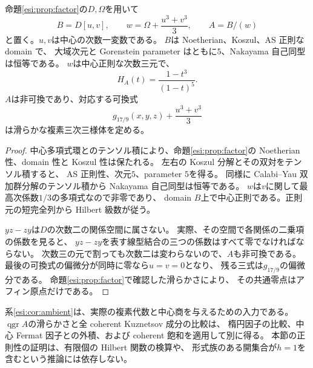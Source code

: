 \begin{corollary}[二つの中心変数を加えた実三次対]
\label{esi:cor:ambient}
命題\ref{esi:prop:factor}の$D,\Omega$を用いて
\begin{equation}\label{esi:eq:ambient}
 B=D[u,v],\qquad w=\Omega+\frac{u^3+v^3}{3},\qquad A=B/(w)
\end{equation}
と置く。$u,v$は中心の次数一変数である。
$B$は Noetherian、Koszul、AS 正則な domain で、
大域次元と Gorenstein parameter はともに$5$、Nakayama 自己同型は恒等である。
$w$は中心正則な次数三元で、
\[
 H_A(t)=\frac{1-t^3}{(1-t)^5}.
\]
$A$は非可換であり、対応する可換式
\[
 g_{17/9}(x,y,z)+\frac{u^3+v^3}{3}
\]
は滑らかな複素三次三様体を定める。
\end{corollary}
\begin{proof}
中心多項式環とのテンソル積により、命題\ref{esi:prop:factor}の
Noetherian 性、domain 性と Koszul 性は保たれる。
左右の Koszul 分解とその双対をテンソル積すると、
AS 正則性、次元$5$、parameter $5$を得る。
同様に Calabi--Yau 双加群分解のテンソル積から Nakayama 自己同型は恒等である。
$w$は$v$に関して最高次係数$1/3$の多項式なので非零であり、
domain $B$上で中心正則である。正則元の短完全列から Hilbert 級数が従う。

$yz-zy$は$D$の次数二の関係空間に属さない。
実際、その空間で各関係の二乗項の係数を見ると、
$yz-zy$を表す線型結合の三つの係数はすべて零でなければならない。
次数三の元で割っても次数二は変わらないので、$A$も非可換である。
最後の可換式の偏微分が同時に零なら$u=v=0$となり、
残る三式は$g_{17/9}$の偏微分である。
命題\ref{esi:prop:factor}で確認した滑らかさにより、
その共通零点はアフィン原点だけである。
\end{proof}

系\ref{esi:cor:ambient}は、実際の複素代数と中心商を与えるための入力である。
$\operatorname{qgr}A$の滑らかさと全 coherent Kuznetsov 成分の比較は、
楕円因子の比較、中心 Fermat 因子との外積、および coherent 飽和を適用して別に得る。
本節の正則性の証明は、有限個の Hilbert 関数の検算や、
形式族のある開集合が$h=1$を含むという推論には依存しない。
